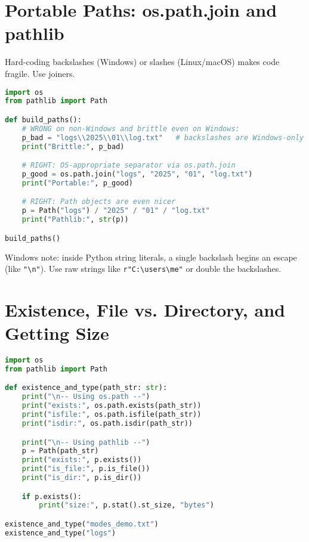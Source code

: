 \section{Portable Paths: os.path.join and pathlib}

Hard-coding backslashes (Windows) or slashes (Linux/macOS) makes code fragile. Use joiners.

\begin{lstlisting}[language=Python, caption={Right vs. wrong for building file paths.}]
import os
from pathlib import Path

def build_paths():
    # WRONG on non-Windows and brittle even on Windows:
    p_bad = "logs\\2025\\01\\log.txt"   # backslashes are Windows-only
    print("Brittle:", p_bad)

    # RIGHT: OS-appropriate separator via os.path.join
    p_good = os.path.join("logs", "2025", "01", "log.txt")
    print("Portable:", p_good)

    # RIGHT: Path objects are even nicer
    p = Path("logs") / "2025" / "01" / "log.txt"
    print("Pathlib:", str(p))

build_paths()
\end{lstlisting}

\noindent
Windows note: inside Python string literals, a single backslash begins an escape (like \texttt{"\textbackslash n"}). Use raw strings like \texttt{r"C:\textbackslash users\textbackslash me"} or double the backslashes.

\section{Existence, File vs. Directory, and Getting Size}

\begin{lstlisting}[language=Python, caption={Check existence and type with both os.path and pathlib.}]
import os
from pathlib import Path

def existence_and_type(path_str: str):
    print("\n-- Using os.path --")
    print("exists:", os.path.exists(path_str))
    print("isfile:", os.path.isfile(path_str))
    print("isdir:", os.path.isdir(path_str))

    print("\n-- Using pathlib --")
    p = Path(path_str)
    print("exists:", p.exists())
    print("is_file:", p.is_file())
    print("is_dir:", p.is_dir())

    if p.exists():
        print("size:", p.stat().st_size, "bytes")

existence_and_type("modes_demo.txt")
existence_and_type("logs")
\end{lstlisting}

